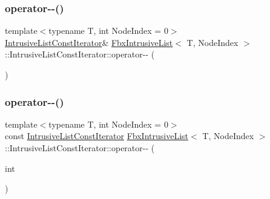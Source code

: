 \mbox{\label{class_fbx_intrusive_list_1_1_intrusive_list_const_iterator_a38f1d1a87aafa5d208c5dbf3158bb26d}} 
\subsubsection{\texorpdfstring{operator-\/-\/()}{operator--()}\hspace{0.1cm}{\footnotesize\ttfamily [1/2]}}
{\footnotesize\ttfamily template$<$typename T, int Node\+Index = 0$>$ \\
\hyperlink{class_fbx_intrusive_list_1_1_intrusive_list_const_iterator}{Intrusive\+List\+Const\+Iterator}\& \hyperlink{class_fbx_intrusive_list}{Fbx\+Intrusive\+List}$<$ T, Node\+Index $>$\+::Intrusive\+List\+Const\+Iterator\+::operator-\/-\/ (\begin{DoxyParamCaption}{ }\end{DoxyParamCaption})}

\mbox{\label{class_fbx_intrusive_list_1_1_intrusive_list_const_iterator_a6db71090bf31cdb269e9e8d0c8e3b30c}} 
\subsubsection{\texorpdfstring{operator-\/-\/()}{operator--()}\hspace{0.1cm}{\footnotesize\ttfamily [2/2]}}
{\footnotesize\ttfamily template$<$typename T, int Node\+Index = 0$>$ \\
const \hyperlink{class_fbx_intrusive_list_1_1_intrusive_list_const_iterator}{Intrusive\+List\+Const\+Iterator} \hyperlink{class_fbx_intrusive_list}{Fbx\+Intrusive\+List}$<$ T, Node\+Index $>$\+::Intrusive\+List\+Const\+Iterator\+::operator-\/-\/ (\begin{DoxyParamCaption}\item[{int}]{ }\end{DoxyParamCaption})}

